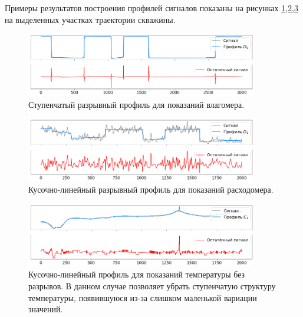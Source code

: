 \par
Примеры результатов построения профилей сигналов показаны на рисунках \ref{fig:dpl_results_wh},\ref{fig:dpl_results_s},\ref{fig:dpl_results_t} на выделенных участках траектории скважины. 

\begin{figure}[H]
\centering
\includegraphics[width=0.9\textwidth]{PLT/dpl_results_wh.png}
\caption{Ступенчатый разрывный профиль для показаний влагомера.}
\label{fig:dpl_results_wh}
\end{figure}

\begin{figure}[H]
\centering
\includegraphics[width=0.9\textwidth]{PLT/dpl_results_s.png}
\caption{Кусочно-линейный разрывный профиль для показаний расходомера.}
\label{fig:dpl_results_s}
\end{figure}

\begin{figure}[H]
\centering
\includegraphics[width=0.9\textwidth]{PLT/dpl_results_t.png}
\caption{Кусочно-линейный профиль для показаний температуры без разрывов. В данном случае позволяет убрать ступенчатую структуру температуры, появившуюся из-за слишком маленькой вариации значений.}
\label{fig:dpl_results_t}
\end{figure}